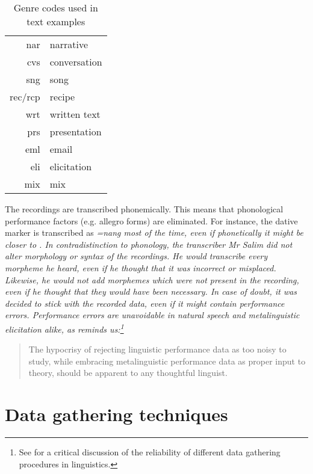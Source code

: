 \begin{table}
\begin{center}
\begin{tabular}{rl}
\ttfamily nar & narrative \\
\ttfamily cvs & conversation \\
\ttfamily sng & song \\
\ttfamily rec/rcp & recipe \\
\ttfamily wrt & written text \\
\ttfamily prs & presentation \\
\ttfamily eml & email \\
\ttfamily eli & elicitation \\
\ttfamily mix & mix \\
\end{tabular}
\caption{Genre codes used in text examples}
\label{tab:genres}
\end{center}
\end{table}

The recordings are transcribed phonemically. This means that phonological performance factors (e.g. allegro forms) are eliminated.
For instance, the dative marker is transcribed as \em =nang \em most of the time, even if phonetically it might be closer to . In contradistinction to phonology, the transcriber Mr Salim did not alter morphology or syntax of the recordings. He would transcribe every morpheme he heard, even if he thought that it was incorrect or misplaced. Likewise, he would not add morphemes which were not present in the recording, even if he thought that they would have been necessary. In case of doubt, it was decided to stick with the recorded data, even if it might contain performance errors. Performance errors are unavoidable in natural speech and metalinguistic elicitation alike, as \citet[72]{Birdsong1989} reminds us:\footnote{See \citet{Schuetze1996} for a critical discussion of the reliability of different data gathering procedures in linguistics.}

\begin{quote}
The hypocrisy of rejecting linguistic performance data as too noisy to study, while embracing metalinguistic performance data as proper input to theory, should be apparent to any thoughtful linguist. \citep[72]{Birdsong1989}
\end{quote}

\section{Data gathering techniques}
